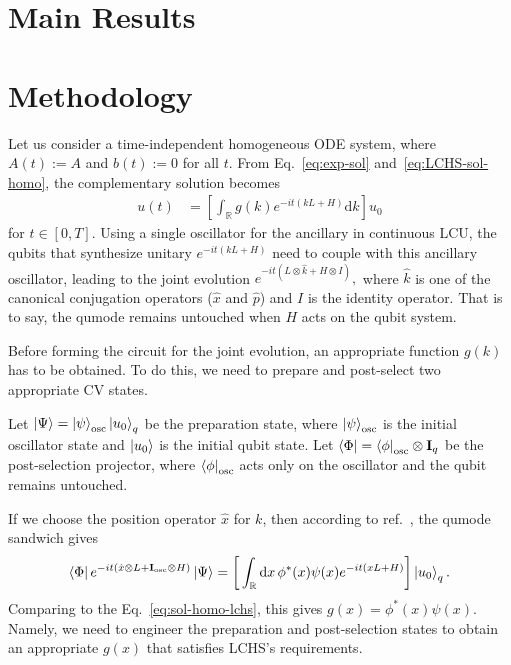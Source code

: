 \documentclass{article}
\newcommand{\dd}{\mathrm{d}}
\newcommand{\Rbb}{\mathbb{R}}
\begin{document}
\section{Main Results}








\section{Methodology}





Let us consider a time-independent homogeneous ODE system, where $A(t):=A$ and $b(t) := 0$ for all $t$. From Eq.~\eqref{eq:exp-sol} and~\eqref{eq:LCHS-sol-homo}, the complementary solution becomes
\begin{align}
    u(t) &= \left[\int_{\Rbb}  g(k)  e^{-i t (kL+H)}  \dd k \right] u_0 \label{eq:sol-homo-lchs}
\end{align}
for $t \in [0,T]$. Using a single oscillator for the ancillary in continuous LCU, the qubits that synthesize unitary $e^{-i t (kL+H)}$ need to couple with this ancillary oscillator, leading to the joint evolution
\(
    e^{-it ( L \otimes \hat{k} + H \otimes I)},
\)
where $\hat{k}$ is one of the canonical conjugation operators ($\hat x$ and $\hat p$) and $I$ is the identity operator. That is to say, the qumode remains untouched when $H$ acts on the qubit system. 

Before forming the circuit for the joint evolution, an appropriate function $g(k)$ has to be obtained. To do this, we need to prepare and post-select two appropriate CV states. 

Let \(\ket{\Psi}=\ket{\psi}_{\rm osc}\ket{u_0}_q\) be the preparation state, where $\ket{\psi}_{\rm osc}$ is the initial oscillator state and $\ket{u_0}$ is the initial qubit state. 
Let \(\bra{\Phi}=\bra{\phi}_{\rm osc}\otimes \mathbf{I}_q\) be the post-selection projector, where $\bra{\phi}_{\rm osc}$ acts only on the oscillator and the qubit remains untouched. 

If we choose the position operator $\hat x$ for $k$, then according to ref.~\cite{bell2025co}, the qumode sandwich gives
\begin{align}
     \bra{\Phi}  e^{-it ( \hat{x} \otimes  L + \mathbf{I}_{\rm osc} \otimes  H)} \ket{\Psi} = \bigg[\int_{\mathbb{R}} \dd x \, \phi^*(x) \psi(x)    e^{-it ( xL + H)}\bigg]\ket{u_0}_q.
\end{align}
Comparing to the Eq.~\eqref{eq:sol-homo-lchs}, this gives \(g(x)= \phi^*(x) \psi(x)\). Namely, we need to engineer the preparation and post-selection states to obtain an appropriate $g(x)$ that satisfies LCHS's requirements. 
\end{document}
